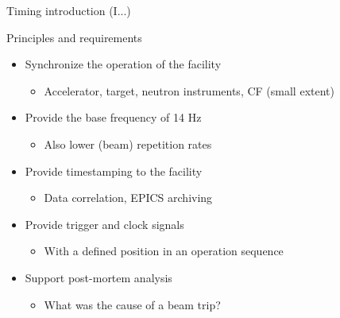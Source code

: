 \documentclass[
  9pt
  , table
  , ignorenonframetext
]{beamer}
\begin{document}
\begin{frame}{Timing introduction (I...)}
  \begin{block}{Principles and requirements}
    \begin{itemize}
    \item Synchronize the operation of the facility
    \begin{itemize}
      \item Accelerator, target, neutron instruments, CF (small extent)
    \end{itemize}
    \item Provide the base frequency of 14 Hz
    \begin{itemize}
      \item Also lower (beam) repetition rates
    \end{itemize}
    \item Provide timestamping to the facility
    \begin{itemize}
      \item Data correlation, EPICS archiving
    \end{itemize}
    \item Provide trigger and clock signals
    \begin{itemize}
      \item With a defined position in an operation sequence
    \end{itemize}
    \item Support post-mortem analysis
    \begin{itemize}
      \item What was the cause of a beam trip?
    \end{itemize}
    \end{itemize}
  \end{block}
\end{frame}
\end{document}
